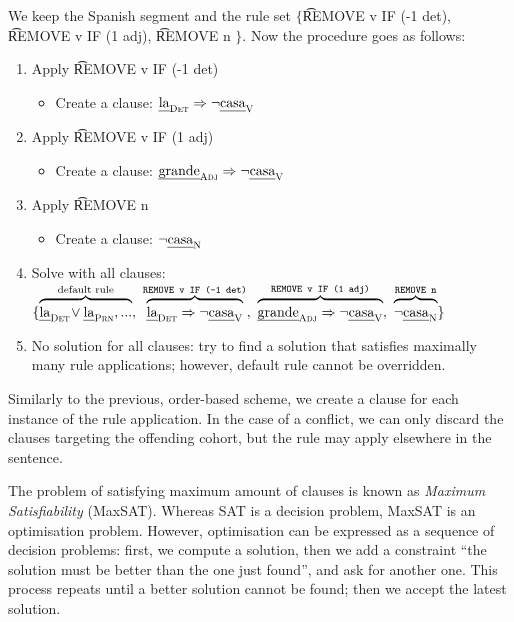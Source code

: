 
We keep the Spanish segment and the rule set $\{$\t{REMOVE v IF (-1 det)}, \t{REMOVE v IF (1 adj)}, \t{REMOVE n} $\}$.
Now the procedure goes as follows:

\begin{enumerate}
\item Apply \t{REMOVE v IF (-1 det)}
 \begin{itemize}
    \item Create a clause: $\text{\em la}_{\text{\sc Det}} \Rightarrow \neg \text{\em casa}_{\text{\sc V}}$
 \end{itemize}
\item Apply \t{REMOVE v IF (1 adj)} 
 \begin{itemize}
    \item Create a clause: $\text{\em grande}_{\text{\sc Adj}} \Rightarrow \neg \text{\em casa}_{\text{\sc V}}$
 \end{itemize}
\item Apply \t{REMOVE n}
 \begin{itemize}
    \item Create a clause: $\neg \text{\em casa}_{\text{\sc N}}$
 \end{itemize}

\item Solve with all clauses:
  $\{ \ob{\laDet \! \vee \laPrn, ...}^{\text{default rule}}, \ 
      \ob{\laDet \Rightarrow \neg \casaV}^{\t{REMOVE v IF (-1 det)}}, \ 
      \ob{\grandeAdj \Rightarrow \neg \casaV}^{\t{REMOVE v IF (1 adj)}}, \ 
      \ob{\neg \casaN}^{\t{REMOVE n}} \}$
\item No solution for all clauses: try to find a solution that satisfies maximally many rule applications; however, default rule cannot be overridden.
\end{enumerate}

Similarly to the previous, order-based scheme, we create a clause for each 
instance of the rule application. In the case of a conflict, we can 
only discard the clauses targeting the offending cohort, but the rule may apply 
elsewhere in the sentence.


The problem of satisfying maximum amount of clauses is known as \emph{Maximum Satisfiability} (MaxSAT).
Whereas SAT is a decision problem, MaxSAT is an optimisation problem.
However, optimisation can be expressed as a sequence of decision problems:
first, we compute a solution, then we add a constraint ``the solution must be better than the one just found'', and ask for another one. 
This process repeats until a better solution cannot be found; then we accept the 
latest solution.

